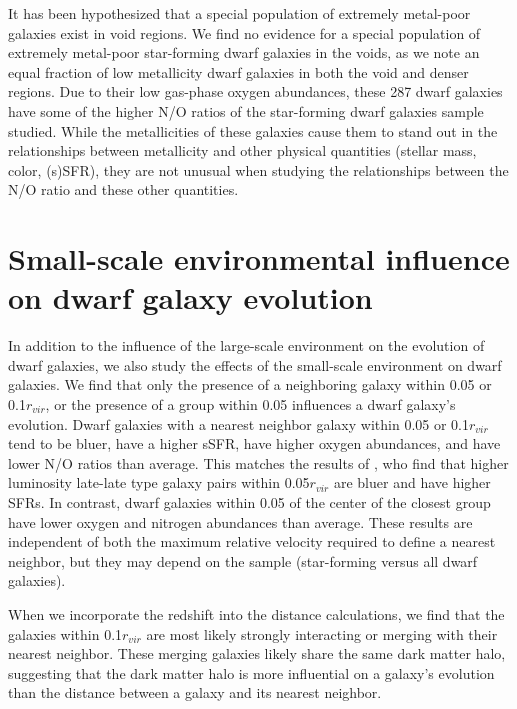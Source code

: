 It has been hypothesized that a special population of extremely metal-poor 
galaxies exist in void regions.  We find no evidence for a special population of 
extremely metal-poor star-forming dwarf galaxies in the voids, as we note an 
equal fraction of low metallicity dwarf galaxies in both the void and denser 
regions.  Due to their low gas-phase oxygen abundances, these 287 dwarf galaxies 
have some of the higher N/O ratios of the star-forming dwarf galaxies sample 
studied.  While the metallicities of these galaxies cause them to stand out in 
the relationships between metallicity and other physical quantities (stellar 
mass, color, (s)SFR), they are not unusual when studying the relationships 
between the N/O ratio and these other quantities.

\section[Small-scale environment]{Small-scale environmental influence on dwarf galaxy evolution}
In addition to the influence of the large-scale environment on the evolution of 
dwarf galaxies, we also study the effects of the small-scale environment on dwarf 
galaxies.  We find that only the presence of a neighboring galaxy within 0.05 
\hMpc or 0.1$r_{vir}$, or the presence of a group within 0.05 \hMpc influences a 
dwarf galaxy's evolution.  Dwarf galaxies with a nearest neighbor galaxy within 
0.05 \hMpc or 0.1$r_{vir}$ tend to be bluer, have a higher sSFR, have higher 
oxygen abundances, and have lower N/O ratios than average.  This matches the 
results of \cite{Park09}, who find that higher luminosity late-late type galaxy 
pairs within 0.05$r_{vir}$ are bluer and have higher SFRs.  In contrast, dwarf 
galaxies within 0.05 \hMpc of the center of the closest group have lower oxygen 
and nitrogen abundances than average.  These results are independent of both the 
maximum relative velocity required to define a nearest neighbor, but they may 
depend on the sample (star-forming versus all dwarf galaxies).

When we incorporate the redshift into the distance calculations, we find that 
the galaxies within 0.1$r_{vir}$ are most likely strongly interacting or merging 
with their nearest neighbor.  These merging galaxies likely share the same dark 
matter halo, suggesting that the dark matter halo is more influential on a 
galaxy's evolution than the distance between a galaxy and its nearest neighbor.

